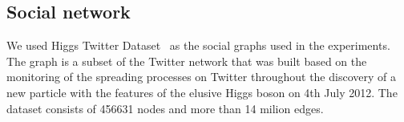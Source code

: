 \subsection{Social network}

We used Higgs Twitter Dataset~\cite{snapnets} as the social graphs used in the experiments. 
The graph is a subset of the Twitter network that was built based on the monitoring of the spreading
processes on Twitter throughout the discovery of a new particle with the features of the elusive 
Higgs boson on 4th July 2012. The dataset consists of 456631 nodes and more than 14 milion edges.



%

